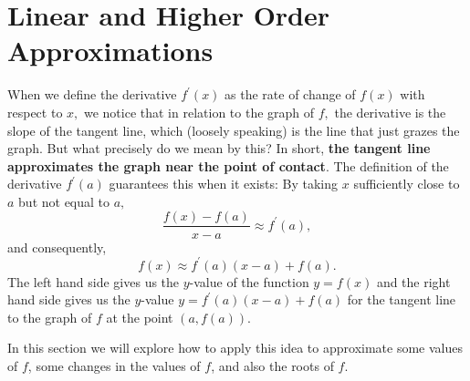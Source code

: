 \section{Linear and Higher Order Approximations}\label{sec:Approx}
When we define the derivative $f^{\prime
}\left( x\right) $ as the rate of change of $f\left( x\right) $ with respect
to $x,$ we notice that in relation to the graph of $f,$ the derivative is
the slope of the tangent line, which (loosely speaking) is the line that just
grazes the graph. But what precisely do we mean by this? In short,
\textbf{the tangent line approximates the graph near the point of contact}. The
definition of the derivative $f^{\prime }\left( a\right) $ guarantees this
when it exists: By taking $x$ sufficiently close to $a$ but not equal to $a,$%
\begin{equation*}
\frac{f\left( x\right) -f\left( a\right) }{x-a}\approx f^{\prime }\left(
a\right) ,
\end{equation*}%
and consequently,%
\begin{equation*}
f\left( x\right) \approx f^{\prime }\left( a\right) \left( x-a\right)
+f\left( a\right) .
\end{equation*}%
The left hand side gives us the $y$-value of the function $y=f\left(
x\right) $ and the right hand side gives us the $y$-value $y=f^{\prime
}\left( a\right) \left( x-a\right) +f\left( a\right) $ for the tangent line
to the graph of $f$ at the point $\left( a,f\left( a\right) \right) .$

In this section we will explore how to apply this idea to approximate some
values of $f$, some changes in the values of $f$, and also the roots of $f.$






